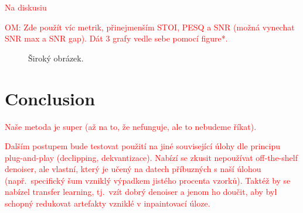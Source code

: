 \documentclass[conference]{IEEEtran}
\newcommand{\todo}[1]{\textcolor{red}{#1}}
\begin{document}
\todo{Na diskusiu}

\todo{OM: Zde použít víc metrik, přinejmenším STOI, PESQ a SNR (možná vynechat SNR max a SNR gap). Dát 3 grafy vedle sebe pomocí figure*.}

\begin{figure*}
	\caption{Široký obrázek.}
\end{figure*}

\section{Conclusion}
\label{sec:conclusion}

\todo{Naše metoda je super (až na to, že nefunguje, ale to nebudeme říkat).}

\todo{Dalším postupem bude testovat použití na jiné související úlohy dle principu plug-and-play (declipping, dekvantizace). Nabízí se zkusit nepoužívat off-the-shelf denoiser, ale vlastní, který je učený na datech příbuzných s naší úlohou (např.\ specifický šum vzniklý výpadkem jistého procenta vzorků). Taktéž by se nabízel transfer learning, tj.\ vzít dobrý denoiser a jenom ho doučit, aby byl schopný redukovat artefakty vzniklé v inpaintovací úloze.}

%



\end{document}
